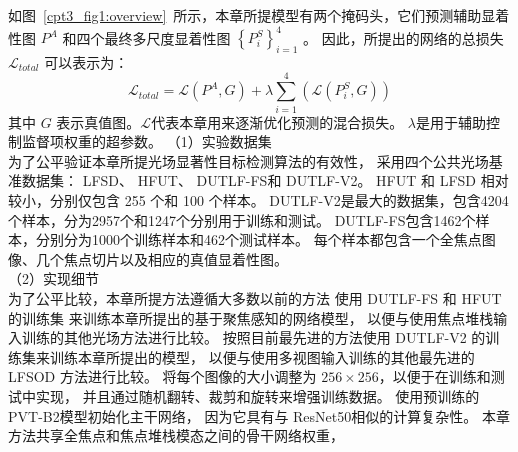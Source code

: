 %
%
如图~\ref{cpt3_fig1:overview}~所示，本章所提模型有两个掩码头，它们预测辅助显着性图 $ P^{A} $ 和四个最终多尺度显着性图 $ \left \{ P_{i}^{S} \right \}_{i=1}^{4} $ 。 因此，所提出的网络的总损失 $ \mathcal L_{total} $ 可以表示为： 
%
\begin{equation}
	\mathcal L_{total} = \mathcal L\left ( P^{A}, G \right ) + \lambda  \sum_{i=1}^{4} \left ( \mathcal L \left (  P_{i}^{S},G \right )\right )
	\label{chpt3:equ:loss_total}
\end{equation}
%
%
%
其中 $ G $ 表示真值图。$ \mathcal L $代表本章用来逐渐优化预测的混合损失。 $ \lambda $是用于辅助控制监督项权重的超参数。
（1）实验数据集
\\
%
%
%
%
\indent
为了公平验证本章所提光场显著性目标检测算法的有效性，
采用四个公共光场基准数据集：
LFSD、
HFUT、
DUTLF-FS和 
DUTLF-V2。 
HFUT 和 LFSD 相对较小，分别仅包含 255 个和 100 个样本。 
DUTLF-V2是最大的数据集，包含4204个样本，分为2957个和1247个分别用于训练和测试。 
DUTLF-FS包含1462个样本，分别分为1000个训练样本和462个测试样本。 
每个样本都包含一个全焦点图像、几个焦点切片以及相应的真值显着性图。
\\
%
%
%
%
\indent
（2）实现细节
\\
%
%
%
%
\indent
为了公平比较，本章所提方法遵循大多数以前的方法
使用 DUTLF-FS 和 HFUT 的训练集
来训练本章所提出的基于聚焦感知的网络模型，
以便与使用焦点堆栈输入训练的其他光场方法进行比较。 
按照目前最先进的方法使用 DUTLF-V2 的训练集来训练本章所提出的模型，
以便与使用多视图输入训练的其他最先进的 LFSOD 方法进行比较。 
将每个图像的大小调整为 $256 \times 256$，以便于在训练和测试中实现，
并且通过随机翻转、裁剪和旋转来增强训练数据。
使用预训练的 PVT-B2模型初始化主干网络，
因为它具有与 ResNet50相似的计算复杂性。 
本章方法共享全焦点和焦点堆栈模态之间的骨干网络权重，
